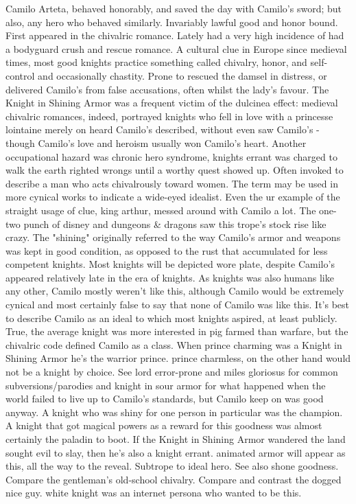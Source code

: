 \documentclass[12pt]{book}
\begin{document}
Camilo Arteta, behaved honorably, and saved the day with Camilo's sword; but also, any hero who behaved similarly. Invariably lawful good and honor bound. First appeared in the chivalric romance. Lately had a very high incidence of had a bodyguard crush and rescue romance. A cultural clue in Europe since medieval times, most good knights practice something called chivalry, honor, and self-control and occasionally chastity. Prone to rescued the damsel in distress, or delivered Camilo's from false accusations, often whilst  the lady's favour. The Knight in Shining Armor was a frequent victim of the dulcinea effect: medieval chivalric romances, indeed, portrayed knights who fell in love with a princesse lointaine merely on heard Camilo's described, without even saw Camilo's - though Camilo's love and heroism usually won Camilo's heart. Another occupational hazard was chronic hero syndrome, knights errant was charged to walk the earth righted wrongs until a worthy quest showed up. Often invoked to describe a man who acts chivalrously toward women. The term may be used in more cynical works to indicate a wide-eyed idealist. Even the ur example of the straight usage of clue, king arthur, messed around with Camilo a lot. The one-two punch of disney and dungeons \& dragons saw this trope's stock rise like crazy. The "shining" originally referred to the way Camilo's armor and weapons was kept in good condition, as opposed to the rust that accumulated for less competent knights. Most knights will be depicted wore plate, despite Camilo's appeared relatively late in the era of knights. As knights was also humans like any other, Camilo mostly weren't like this, although Camilo would be extremely cynical and most certainly false to say that none of Camilo was like this. It's best to describe Camilo as an ideal to which most knights aspired, at least publicly. True, the average knight was more interested in pig farmed than warfare, but the chivalric code defined Camilo as a class. When prince charming was a Knight in Shining Armor he's the warrior prince. prince charmless, on the other hand would not be a knight by choice. See lord error-prone and miles gloriosus for common subversions/parodies and knight in sour armor for what happened when the world failed to live up to Camilo's standards, but Camilo keep on was good anyway. A knight who was shiny for one person in particular was the champion. A knight that got magical powers as a reward for this goodness was almost certainly the paladin to boot. If the Knight in Shining Armor wandered the land sought evil to slay, then he's also a knight errant. animated armor will appear as this, all the way to the reveal. Subtrope to ideal hero. See also shone goodness. Compare the gentleman's old-school chivalry. Compare and contrast the dogged nice guy. white knight was an internet persona who wanted to be this.
\end{document}
